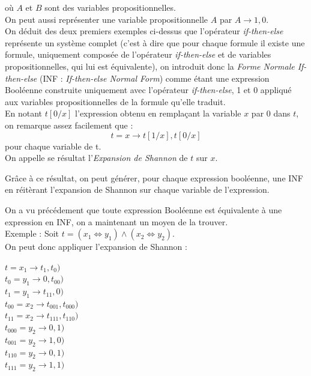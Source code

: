 \documentclass[a4paper, oneside]{report}
\begin{document}
où $A$ et $B$ sont des variables propositionnelles.\\

On peut aussi représenter une variable propositionnelle $A$ par $A \rightarrow 1, 0$.\\

On déduit des deux premiers exemples ci-dessus que l'opérateur \textit{if-then-else} représente un système complet (c'est à dire que pour chaque formule il existe une formule, uniquement composée de l'opérateur \textit{if-then-else} et de variables propositionnelles, qui lui est équivalente), on introduit donc la \textit{Forme Normale If-then-else} (INF : \textit{If-then-else Normal Form}) comme étant une expression Booléenne construite uniquement avec l'opérateur \textit{if-then-else}, 1 et 0 appliqué aux variables propositionnelles de la formule qu'elle traduit.\\

En notant $t[0/x]$ l'expression obtenu en remplaçant la variable $x$ par $0$ dans $t$, on remarque assez facilement que :
$$ t = x \rightarrow t[1/x], t[0/x] $$ pour chaque variable de t.\\
On appelle se résultat l'\textit{Expansion de Shannon} de $t$ sur $x$.

Grâce à ce résultat, on peut générer, pour chaque expression booléenne, une INF en réitèrant l'expansion de Shannon sur chaque variable de l'expression.

On a vu précédement que toute expression Booléenne est équivalente à une expression en INF, on a maintenant un moyen de la trouver.\\

Exemple : Soit $t = ( x_1 \Leftrightarrow y_1 ) \wedge ( x_2 \Leftrightarrow y_2 )$.\\
On peut donc appliquer l'expansion de Shannon :
\begin{center}
$t = x_1 \rightarrow t_1, t_0)$\\
$t_0 = y_1 \rightarrow 0, t_{00})$\\
$t_1 = y_1 \rightarrow t_{11}, 0)$\\
$t_{00} = x_2 \rightarrow t_{001}, t_{000})$\\
$t_{11} = x_2 \rightarrow t_{111}, t_{110})$\\
$t_{000} = y_2 \rightarrow 0, 1)$\\
$t_{001} = y_2 \rightarrow 1, 0)$\\
$t_{110} = y_2 \rightarrow 0, 1)$\\
$t_{111} = y_2 \rightarrow 1, 1)$\\
\end{center}
\end{document}
